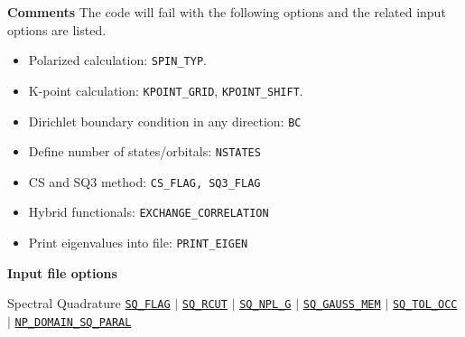 
\begin{frame}[allowframebreaks]{\textbf{Comments}} \label{Introduction}
The code will fail with the following options and the related input options are listed.
\begin{itemize}
  \item Polarized calculation: \texttt{SPIN\_TYP}.
  \item K-point calculation: \texttt{KPOINT\_GRID}, \texttt{KPOINT\_SHIFT}.
  \item Dirichlet boundary condition in any direction: \texttt{BC}
  \item Define number of states/orbitals: \texttt{NSTATES}
  \item CS and SQ3 method: \texttt{CS\_FLAG, SQ3\_FLAG}
  \item Hybrid functionals: \texttt{EXCHANGE\_CORRELATION}
  \item Print eigenvalues into file: \texttt{PRINT\_EIGEN}
\end{itemize}

\end{frame}

\begin{frame}[allowframebreaks]{\textbf{Input file options}} \label{Index}
\vspace{-2mm}
 \begin{block}{Spectral Quadrature}
\hyperlink{SQ_FLAG}{\texttt{SQ\_FLAG}} $\vert$ 
\hyperlink{SQ_RCUT}{\texttt{SQ\_RCUT}} $\vert$ 
\hyperlink{SQ_NPL_G}{\texttt{SQ\_NPL\_G}}  $\vert$ 
\hyperlink{SQ_GAUSS_MEM}{\texttt{SQ\_GAUSS\_MEM}} $\vert$ 
\hyperlink{SQ_TOL_OCC}{\texttt{SQ\_TOL\_OCC}} $\vert$ 
\hyperlink{NP_DOMAIN_SQ_PARAL}{\texttt{NP\_DOMAIN\_SQ\_PARAL}} 
\end{block}

\end{frame}
